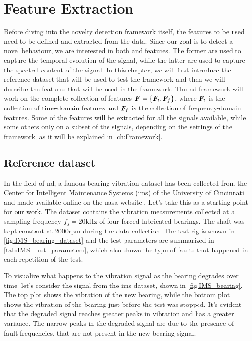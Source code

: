 \chapter{Feature Extraction}
\label{ch:FeatureExtraction}

Before diving into the novelty detection framework itself, the features to be used need to be defined and extracted from the data. Since our goal is to detect a novel behaviour, we are interested in both  and  features. The former are used to capture the temporal evolution of the signal, while the latter are used to capture the spectral content of the signal. 
In this chapter, we will first introduce the reference dataset that will be used to test the framework and then we will describe the features that will be used in the framework. The \gls{nd} framework will work on the complete collection of features $\bm{F}=\{\bm{F}_t, \bm{F}_f\}$, where $\bm{F}_t$ is the collection of time-domain features and $\bm{F}_f$ is the collection of frequency-domain features. Some of the features will be extracted for all the signals available, while some others only on a subset of the signals, depending on the settings of the framework, as it will be explained in \autoref{ch:Framework}. 



\section{Reference dataset}
In the field of \gls{nd}, a famous bearing vibration dataset has been collected from the Center for Intelligent Maintenance Systems (\gls{ims}) of the University of Cincinnati and made available online on the \gls{nasa} website \cite{lee2007bearingdataset}. 
Let's take this as a starting point for our work. The dataset contains the vibration measurements collected at a sampling frequency $f_s=20\si{\kHz}$ of four forced-lubricated bearings. The shaft was kept constant at $2000$rpm during the data collection. The test rig is shown in \autoref{fig:IMS_bearing_dataset} and the test parameters are summarized in \autoref{tab:IMS_test_parameters}, which also shows the type of faults that happened in each repetition of the test.

To visualize what happens to the vibration signal as the bearing degrades over time, let's consider the  signal from the \gls{ims} dataset, shown in \autoref{fig:IMS_bearing}. The top plot shows the vibration of the new bearing, while the bottom plot shows the vibration of the bearing just before the test was stopped. It's evident that the degraded signal reaches greater peaks in vibration and has a greater variance. The narrow peaks in the degraded signal are due to the presence of fault frequencies, that are not present in the new bearing signal.

